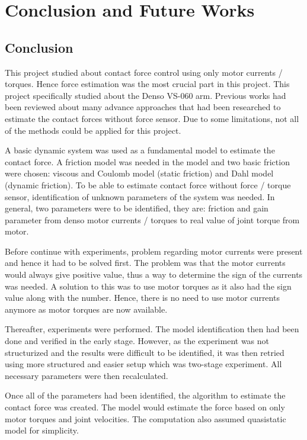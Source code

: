 \chapter{Conclusion and Future Works}
\section{Conclusion}
This project studied about contact force control using only motor currents / torques. Hence force estimation was the most crucial part in this project. This project specifically studied about the Denso VS-060 arm. Previous works had been reviewed about many advance approaches that had been researched to estimate the contact forces without force sensor. Due to some limitations, not all of the methods could be applied for this project. 

A basic dynamic system was used as a fundamental model to estimate the contact force. A friction model was needed in the model and two basic friction were chosen: viscous and Coulomb model (static friction) and Dahl model (dynamic friction). To be able to estimate contact force without force / torque sensor, identification of unknown parameters of the system was needed. In general, two parameters were to be identified, they are: friction and gain parameter from denso motor currents / torques to real value of joint torque from motor. 

Before continue with experiments, problem regarding motor currents were present and hence it had to be solved first. The problem was that the motor currents would always give positive value, thus a way to determine the sign of the currents was needed. A solution to this was to use motor torques as it also had the sign value along with the number. Hence, there is no need to use motor currents anymore as motor torques are now available. 

Thereafter, experiments were performed. The model identification then had been done and verified in the early stage. However, as the experiment was not structurized and the results were difficult to be identified, it was then retried using more structured and easier setup which was two-stage experiment. All necessary parameters were then recalculated.

Once all of the parameters had been identified, the algorithm to estimate the contact force was created. The model would estimate the force based on only motor torques and joint velocities. The computation also assumed quasistatic model for simplicity.

